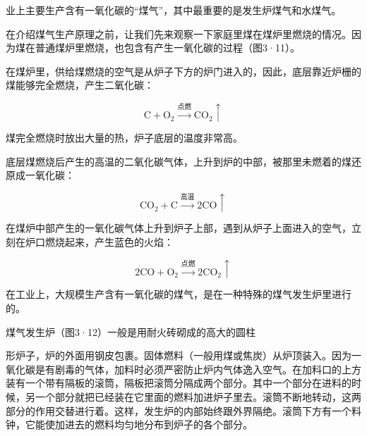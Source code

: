 业上主要生产含有一氧化碳的``煤气''，其中最重要的是发生炉煤气和水煤气。

在介绍煤气生产原理之前，让我们先来观察一下家庭里煤在煤炉里燃烧的情况。因为煤在普通煤炉里燃烧，也包含有产生一氧化碳的过程（图3·11）。

在煤炉里，供给煤燃烧的空气是从炉子下方的炉门进入的，因此，底层靠近炉栅的煤能够完全燃烧，产生二氧化碳：

\[
\mathrm{C} + \mathrm{O}_{2} \xrightarrow {\text{点燃}} \mathrm{CO}_{2} \uparrow
\]

煤完全燃烧时放出大量的热，炉子底层的温度非常高。

底层煤燃烧后产生的高温的二氧化碳气体，上升到炉的中部，被那里未燃着的煤还原成一氧化碳：

\[
\mathrm{CO}_{2} + \mathrm{C} \xrightarrow {\text{高温}} 2 \mathrm{CO} \uparrow
\]

在煤炉中部产生的一氧化碳气体上升到炉子上部，遇到从炉子上面进入的空气，立刻在炉口燃烧起来，产生蓝色的火焰：

\[
2\mathrm{CO}+\mathrm{O}_{2}\xrightarrow{\text{点燃}}2\mathrm{CO}_{2}\uparrow
\]

在工业上，大规模生产含有一氧化碳的煤气，是在一种特殊的煤气发生炉里进行的。

煤气发生炉（图3·12）一般是用耐火砖砌成的高大的圆柱

形炉子，炉的外面用钢皮包裹。固体燃料（一般用煤或焦炭）从炉顶装入。因为一氧化碳是有剧毒的气体，加料时必须严密防止炉内气体逸入空气。在加料口的上方装有一个带有隔板的滚筒，隔板把滚筒分隔成两个部分。其中一个部分在进料的时候，另一个部分就把已经装在它里面的燃料加进炉子里去。滚筒不断地转动，这两部分的作用交替进行着。这样，发生炉的内部始终跟外界隔绝。滚筒下方有一个料钟，它能使加进去的燃料均匀地分布到炉子的各个部分。

